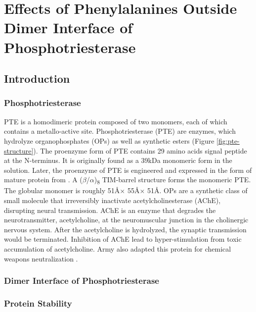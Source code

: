 \chapter{Effects of Phenylalanines Outside Dimer Interface of Phosphotriesterase}
\label{chap:dimer}
\begin{refsection}

\section{Introduction}

\subsection{Phosphotriesterase}

PTE is a homodimeric protein composed of two monomers, each of which contains a
metallo-active site. Phosphotriesterase (PTE) are enzymes, which hydrolyze
organophosphates (OPs) as well as synthetic esters (Figure
\ref{fig:pte-structure})\cite{Ghanem2005a}. The proenzyme form of PTE contains
29 amino acids signal peptide at the N-terminus. It is originally found as a
39kDa monomeric form in the solution\cite{Mulbry1989}. Later, the proenzyme of
PTE is engineered and expressed in the form of mature protein from . A ($\beta$/$\alpha$)\textsubscript{8} TIM-barrel structure forms the
monomeric PTE\cite{Roodveldt2005,Seibert2005}. The globular monomer is roughly
51\AA $\times$ 55\AA $\times$ 51\AA.  OPs are a synthetic class of small molecule
that irreversibly inactivate acetylcholinesterase (AChE), disrupting
neural transmission. AChE is an enzyme that degrades the neurotransmitter,
acetylcholine, at the neuromuscular junction in the cholinergic nervous system.
After the acetylcholine is hydrolyzed, the synaptic transmission would be
terminated. Inhibition of AChE lead to hyper-stimulation from toxic
accumulation of acetylcholine\cite{Soreq2001}. Army also adapted this protein
for chemical weapons neutralization \cite{Yang2014a}.

\subsection{Dimer Interface of Phosphotriesterase}

\subsection{Protein Stability}


\end{refsection}
